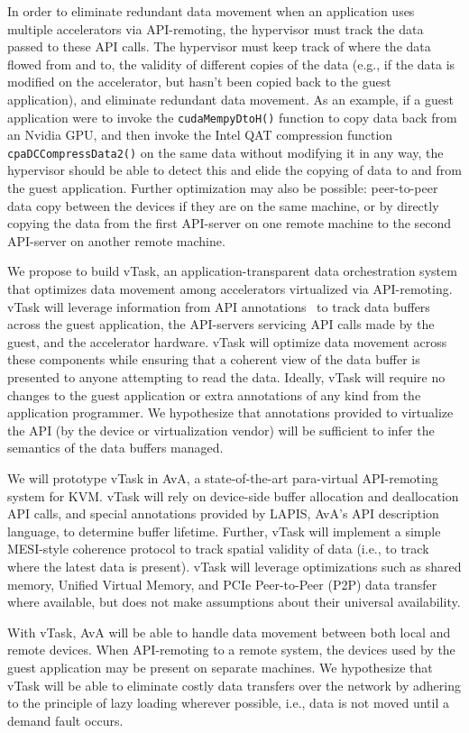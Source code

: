 In order to eliminate redundant data movement when an application uses
multiple accelerators via API-remoting, the hypervisor must track the data
passed to these API calls. The hypervisor must keep track of where the data
flowed from and to, the validity of different copies of the data (e.g., if the
data is modified on the accelerator, but hasn’t been copied back to the guest
application), and eliminate redundant data movement. As an example, if a guest
application were to invoke the \texttt{cudaMempyDtoH()} function to copy data
back from an Nvidia GPU, and then invoke the Intel QAT compression function
\texttt{cpaDCCompressData2()} on the same data without modifying it in any
way, the hypervisor should be able to detect this and elide the copying of
data to and from the guest application. Further optimization may also be
possible: peer-to-peer data copy between the devices if they are on the same
machine, or by directly copying the data from the first API-server on one
remote machine to the second API-server on another remote machine.

We propose to build vTask, an application-transparent data orchestration
system that optimizes data movement among accelerators virtualized via
API-remoting. vTask will leverage information from API
annotations~\cite{ava-hotos} to track data buffers across the guest
application, the API-servers servicing API calls made by the guest, and the
accelerator hardware. vTask will optimize data movement across these
components while ensuring that a coherent view of the data buffer is presented
to anyone attempting to read the data. Ideally, vTask will require no changes
to the guest application or  extra annotations of any kind from the
application programmer. We hypothesize that annotations provided to virtualize
the API (by the device or virtualization vendor) will be sufficient to infer
the semantics of the data buffers managed.

We will prototype vTask in AvA, a state-of-the-art para-virtual API-remoting
system for KVM. vTask will rely on device-side buffer allocation and
deallocation API calls, and special annotations provided by LAPIS, AvA’s API
description language, to determine buffer lifetime. Further, vTask will
implement a simple MESI-style coherence protocol to track spatial validity of
data (i.e., to track where the latest data is present). vTask will leverage
optimizations such as shared memory, Unified Virtual Memory, and PCIe
Peer-to-Peer (P2P) data transfer where available, but does not make
assumptions about their universal availability.

With vTask, AvA will be able to handle data movement between both local and
remote devices. When API-remoting to a remote system, the devices used by the
guest application may be present on separate machines. We hypothesize that
vTask will be able to eliminate costly data transfers over the network by
adhering to the principle of lazy loading wherever possible, i.e., data is not
moved until a demand fault occurs.